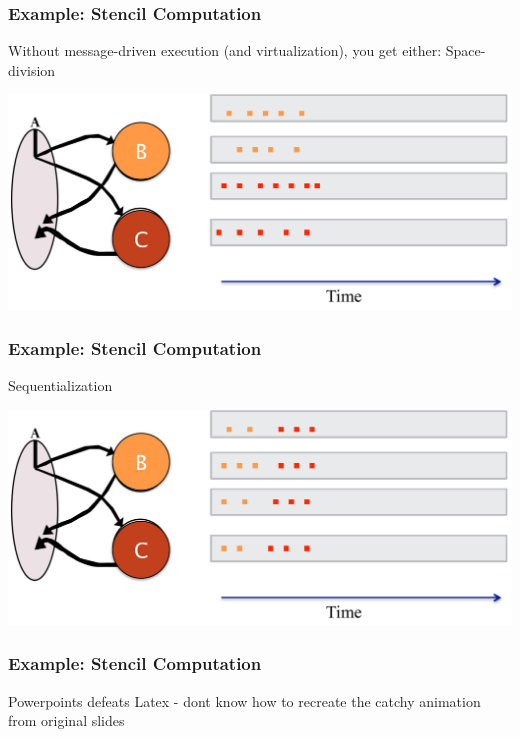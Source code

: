 \begin{frame}[t]
\frametitle{Example: Stencil Computation}
Without message-driven execution (and virtualization), you get either: Space-division

  \begin{center} \includegraphics[width=\textwidth]{figures/stencil_space} \end{center}
\end{frame}

\begin{frame}[t]
\frametitle{Example: Stencil Computation}
Sequentialization

  \begin{center} \includegraphics[width=\textwidth]{figures/stencil_seq} \end{center}
\end{frame}

\begin{frame}[t]
\frametitle{Example: Stencil Computation}
Powerpoints defeats Latex - dont know how to recreate the catchy animation from
original slides
\end{frame}

